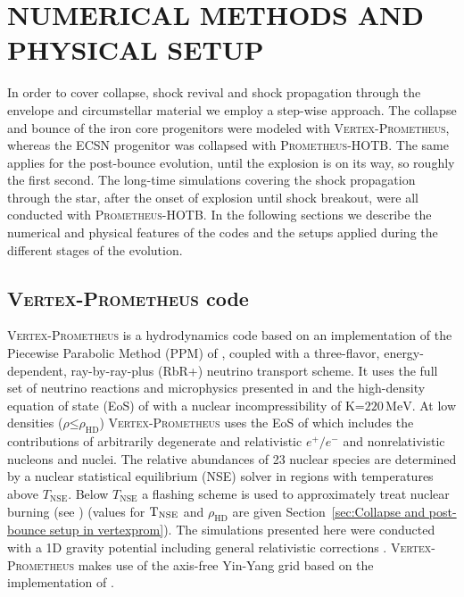 \documentclass[fleqn,usenatbib]{mnras}
\newcommand{\prom}{\textsc{Prometheus-HOTB}\xspace}
\newcommand{\vertexprom}{\textsc{Vertex-Prometheus}\xspace}
\begin{document}
\section{NUMERICAL METHODS AND PHYSICAL SETUP}
\label{sec:Numerical and physical Setup}
In order to cover collapse, shock revival 
and shock propagation through the envelope and 
circumstellar material we employ a step-wise approach.
The collapse and bounce of the iron core progenitors 
were modeled with \vertexprom, whereas the ECSN progenitor 
was collapsed with \prom.
The same applies for the post-bounce evolution, until the 
explosion is on its way, so roughly the first second. 
The long-time simulations covering the shock propagation 
through the star, after the onset of explosion until shock 
breakout, were all conducted with \prom.
In the following sections we describe the numerical and physical 
features of the codes and the setups applied during the different 
stages of the evolution.

\subsection{\vertexprom code}
\vertexprom is a hydrodynamics code based on an implementation of the 
Piecewise Parabolic Method (PPM) of \cite{Colella1984}, coupled 
with a three-flavor, energy-dependent, ray-by-ray-plus (RbR+) 
neutrino transport scheme. It uses the full set of neutrino reactions and 
microphysics presented in \cite{Buras2006} and the high-density equation 
of state (EoS) of \cite{Lattimer1991} with a nuclear incompressibility of 
$\mathrm{K}\mathord{=} 220\,\mathrm{MeV}$.
At low densities ($\rho\mathord{\leq}\rho_{\mathrm{HD}}$) 
\vertexprom uses the EoS of \cite{Janka1999} which 
includes the contributions of arbitrarily degenerate and relativistic $e^+/e^-$ 
and nonrelativistic nucleons and nuclei. The relative abundances of 23 nuclear
species are determined by a nuclear statistical equilibrium (NSE) solver in 
regions with temperatures above $T_{\mathrm{NSE}}$. Below $T_{\mathrm{NSE}}$ a 
flashing scheme is used to approximately treat nuclear burning 
(see \citealt{Rampp2002}) (values for $\rm T_{NSE}$ and 
$\rho_{\mathrm{HD}}$ are given Section~\ref{sec:Collapse and post-bounce setup in vertexprom}). 
The simulations presented here were conducted with a 1D gravity potential 
including general relativistic corrections \citep{Marek2006}. \vertexprom
makes use of the axis-free Yin-Yang grid \citep{Kageyama2004} based on 
the implementation of \cite{Melson2016}.
\end{document}
